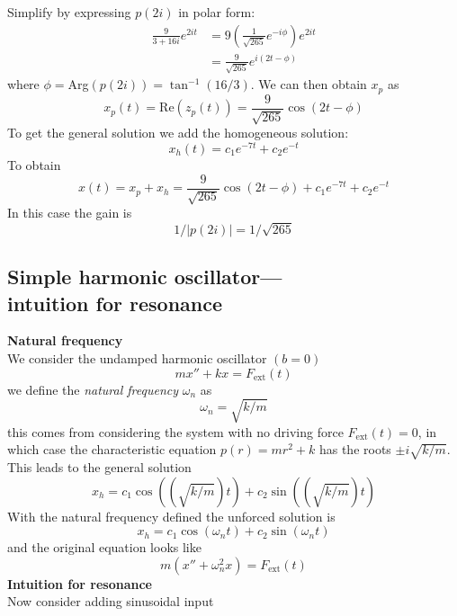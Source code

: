 \documentclass{report}
\begin{document}
Simplify by expressing $p(2i)$ in polar form:
\begin{align*}
\frac{9}{3+16i}e^{2it}&=9\left(\frac{1}{\sqrt{265}}e^{-i\phi}\right)e^{2it}\\
&=\frac{9}{\sqrt{265}}e^{i(2t-\phi)}
\end{align*}
where $\phi=$Arg$(p(2i))=\tan^{-1}(16/3)$. We can then obtain $x_p$ as
\begin{equation*}
x_p(t)=\text{Re}(z_p(t))=\frac{9}{\sqrt{265}}\cos(2t-\phi)
\end{equation*}
To get the general solution we add the homogeneous solution:
\begin{equation*}
x_h(t)=c_1e^{-7t}+c_2e^{-t}
\end{equation*}
To obtain
\begin{equation*}
x(t)=x_p+x_h=\frac{9}{\sqrt{265}}\cos(2t-\phi)+c_1e^{-7t}+c_2e^{-t}
\end{equation*}
In this case the gain is
\begin{equation*}
1/|p(2i)|=1/\sqrt{265}
\end{equation*}
\newpage

\subsection{Simple harmonic oscillator---\\intuition for resonance}
\textbf{Natural frequency}\\
We consider the undamped harmonic oscillator $(b=0)$
\begin{equation*}
mx''+kx=F_{\text{ext}}(t)
\end{equation*}
we define the \textit{natural frequency} $\omega_n$ as
\begin{equation*}
\omega_n=\sqrt{k/m}
\end{equation*}
this comes from considering the system with no driving force $F_{\text{ext}}(t)=0$, in which
case the characteristic equation $p(r)=mr^2+k$ has the roots $\pm i\sqrt{k/m}$. This leads to the general solution
\begin{equation*}
x_h=c_1\cos((\sqrt{k/m})t)+c_2\sin((\sqrt{k/m})t)
\end{equation*}
With the natural frequency defined the unforced solution is
\begin{equation*}
x_h=c_1\cos(\omega_nt)+c_2\sin(\omega_nt)
\end{equation*}
and the original equation looks like
\begin{equation*}
m(x''+\omega_n^2x)=F_{\text{ext}}(t)
\end{equation*}
\textbf{Intuition for resonance}\\
Now consider adding sinusoidal input
\end{document}
